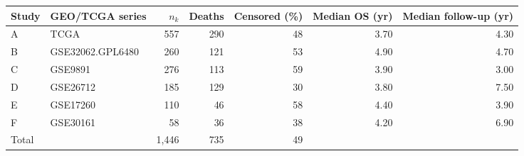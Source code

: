 \begin{tabular}{@{}llrrrrr@{}}
\toprule
Study & GEO/TCGA series & $n_k$ & Deaths & Censored (\%) & Median OS (yr) & Median follow-up (yr) \\
\midrule
A & TCGA & 557 & 290 & 48 & 3.70 & 4.30 \\
B & GSE32062.GPL6480 & 260 & 121 & 53 & 4.90 & 4.70 \\
C & GSE9891 & 276 & 113 & 59 & 3.90 & 3.00 \\
D & GSE26712 & 185 & 129 & 30 & 3.80 & 7.50 \\
E & GSE17260 & 110 & 46 & 58 & 4.40 & 3.90 \\
F & GSE30161 & 58 & 36 & 38 & 4.20 & 6.90 \\
\midrule
Total & & 1,446 & 735 & 49 & & \\
\bottomrule
\end{tabular}
